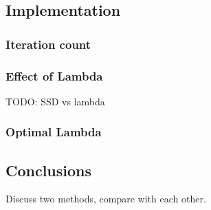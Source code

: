 \documentclass{paper}
\begin{document}
\subsection*{Implementation}

\subsubsection*{Iteration count}


\subsubsection*{Effect of Lambda}
TODO: SSD vs lambda

\subsubsection*{Optimal Lambda}

\subsection*{Conclusions}
Discuss two methods, compare with each other.
\end{document}
